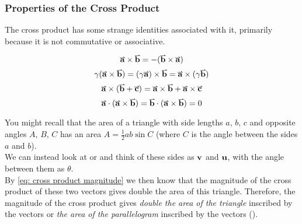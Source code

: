 \documentclass[main.tex]{subfiles}
\begin{document}
                \newpage
                \subsubsection{Properties of the Cross Product}
                    \label{subsubsec: Properties of the Cross Product}

                    The cross product has some strange identities associated with it, primarily because it is not commutative or associative.

                    \begin{equation}
                        \vect{a} \times \vect{b} = -(\vect{b} \times \vect{a})
                    \end{equation}
                    \begin{equation}
                        \gamma (\vect{a} \times \vect{b}) = (\gamma\vect{a}) \times \vect{b} = \vect{a} \times (\gamma\vect{b})
                    \end{equation}
                    \begin{equation}
                        \vect{a} \times (\vect{b} + \vect{c}) = \vect{a} \times \vect{b} + \vect{a} \times \vect{c}
                    \end{equation}
                    \begin{equation}
                        \vect{a} \cdot (\vect{a} \times \vect{b}) = \vect{b} \cdot (\vect{a} \times \vect{b}) = 0
                    \end{equation}

                    You might recall that the area of a triangle with side lengths $a,\, b,\, c$ and opposite angles $A,\, B,\, C$ has an area $A = \frac{1}{2}ab\sin C$ (where $C$ is the angle between the sides $a$ and $b$).\\
                    We can instead look at  or  and think of these sides as $\boldsymbol{\mathbf{v}}$ and $\boldsymbol{\mathbf{u}}$, with the angle between them as $\theta$.\\
                    By \eqref{eq: cross product magnitude} we then know that the magnitude of the cross product of these two vectors gives double the area of this triangle.
                    Therefore, the magnitude of the cross product gives \textit{double the area of the triangle} inscribed by the vectors or \textit{the area of the parallelogram} inscribed by the vectors ().
\end{document}
